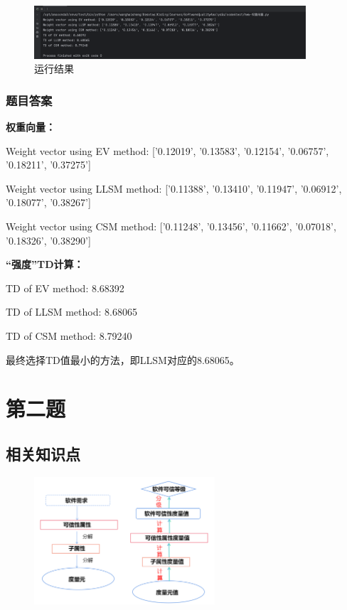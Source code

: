 \documentclass{article}
\begin{document}
\begin{figure}[H]
	\centering
	\includegraphics[width=0.9\textwidth]{img/01.png}
	\caption{运行结果}
\end{figure}

\subsubsection{题目答案}

\textbf{权重向量：}

Weight vector using EV method: ['0.12019', '0.13583', '0.12154', '0.06757', '0.18211', '0.37275']

Weight vector using LLSM method: ['0.11388', '0.13410', '0.11947', '0.06912', '0.18077', '0.38267']

Weight vector using CSM method: ['0.11248', '0.13456', '0.11662', '0.07018', '0.18326', '0.38290']

\textbf{“强度”TD计算：}

TD of EV method: 8.68392

TD of LLSM method: 8.68065

TD of CSM method: 8.79240

最终选择TD值最小的方法，即LLSM对应的8.68065。











\section{第二题}

\subsection{相关知识点}

\begin{figure}[H]
	\centering
	\includegraphics[width=0.6\textwidth]{img/static_1.png}
\end{figure}
\end{document}
